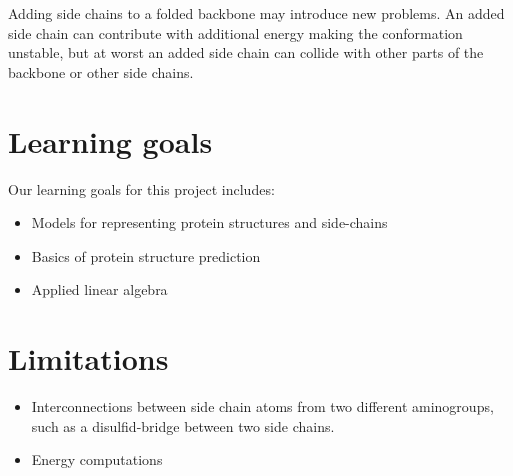 \documentclass[10pt,a4paper,final,oneside,openany,article]{memoir}
\begin{document}
Adding side chains to a folded backbone may introduce new problems. An
added side chain can contribute with additional energy making the
conformation unstable, but at worst an added side chain can collide
with other parts of the backbone or other side chains.




\section{Learning goals}
Our learning goals for this project includes:
\begin{itemize}
\item Models for representing protein structures and side-chains
\item Basics of protein structure prediction
\item Applied linear algebra
\end{itemize}


\section{Limitations}
\begin{itemize}
\item Interconnections between side chain atoms from two different
  aminogroups, such as a disulfid-bridge between two side chains.
\item Energy computations
\end{itemize}





\end{document}
